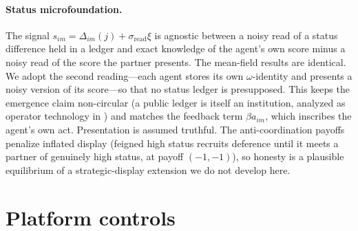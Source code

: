 \documentclass[
  aps,prx,
  reprint,
  superscriptaddress,
  nofootinbib,
  longbibliography
]{revtex4-2}
\newcommand{\sread}{\sigma_{\mathrm{read}}}
\newcommand{\smref}[1]{\cite[Sec.~#1]{SM}}
\begin{document}
\paragraph{Status microfoundation.} The signal $s_{im}=\Delta_{im}(j)+\sread\xi$ is agnostic between a noisy read of a status difference held in a ledger and exact knowledge of the agent's own score minus a noisy read of the score the partner presents. The mean-field results are identical. We adopt the second reading---each agent stores its own $\omega$-identity and presents a noisy version of its score---so that no status ledger is presupposed. This keeps the emergence claim non-circular (a public ledger is itself an institution, analyzed as operator technology in \smref{S4}) and matches the feedback term $\beta a_{im}$, which inscribes the agent's own act. Presentation is assumed truthful. The anti-coordination payoffs penalize inflated display (feigned high status recruits deference until it meets a partner of genuinely high status, at payoff $(-1,-1)$), so honesty is a plausible equilibrium of a strategic-display extension we do not develop here.

\section{Platform controls}\label{app:control}
\end{document}
